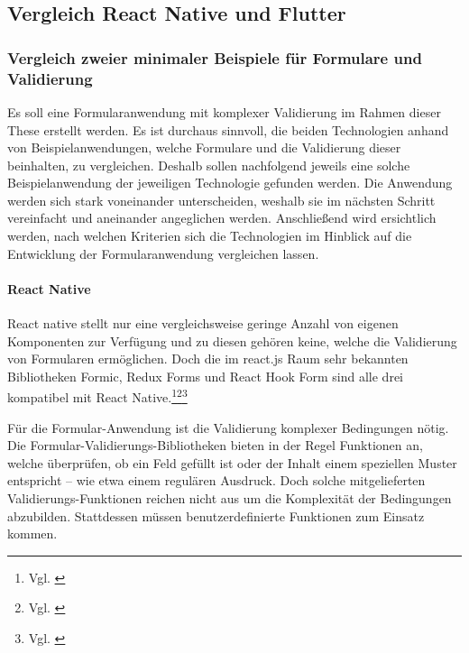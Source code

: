 
\subsection{Vergleich React Native und Flutter}

\subsubsection{Vergleich zweier minimaler Beispiele für Formulare und Validierung}


Es soll eine Formularanwendung mit komplexer Validierung im Rahmen dieser These erstellt werden. Es ist durchaus sinnvoll, die beiden Technologien anhand von  Beispielanwendungen, welche Formulare und die Validierung dieser  beinhalten,   zu vergleichen.  Deshalb sollen nachfolgend  jeweils eine solche Beispielanwendung der jeweiligen Technologie gefunden werden. Die Anwendung werden sich stark voneinander unterscheiden, weshalb sie im nächsten Schritt vereinfacht und aneinander angeglichen werden.  Anschließend wird ersichtlich werden, nach welchen Kriterien sich die Technologien im Hinblick auf die Entwicklung der Formularanwendung vergleichen lassen.

\paragraph{React Native}

React native stellt nur eine vergleichsweise geringe Anzahl von eigenen Komponenten zur Verfügung und zu diesen gehören keine, welche die Validierung von Formularen ermöglichen. Doch die im react.js Raum sehr bekannten Bibliotheken Formic, Redux Forms und React Hook Form sind alle drei kompatibel mit React Native.\footnote{Vgl. \cite{ReactNativeFormikDocs}}\footnote{Vgl. \cite{DoesReduxFormWorkWithReactNative}}\footnote{Vgl. \cite{ReactNativeReactHookFormGetStarted}}




Für die Formular-Anwendung ist die Validierung komplexer Bedingungen nötig. Die Formular-Validierungs-Bibliotheken bieten in der Regel Funktionen an, welche überprüfen, ob ein Feld gefüllt ist oder der Inhalt einem speziellen Muster entspricht – wie etwa einem regulären Ausdruck. Doch solche mitgelieferten Validierungs-Funktionen reichen nicht aus um die Komplexität der Bedingungen abzubilden. Stattdessen müssen benutzerdefinierte Funktionen zum Einsatz kommen.


